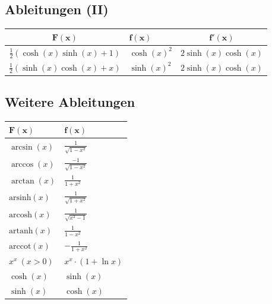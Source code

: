 \documentclass[a4paper,10pt]{article}
\begin{document}
\subsection{Ableitungen (II)}
\begin{center}
  \begin{tabularx}{\linewidth}{c>{\centering\arraybackslash}Xc}
  \toprule
  $\mathbf{F(x)}$ & $\mathbf{f(x)}$ & $\mathbf{f'(x)}$ \\
  \midrule
  $\frac{1}{2}(\cosh(x)\sinh(x)+1)$ & $\cosh(x)^2$ & $2\sinh(x)\cosh(x)$\\
  $\frac{1}{2}(\sinh(x)\cosh(x) + x)$ & $\sinh(x)^2$ & $2\sinh(x)\cosh(x)$\\
  \bottomrule
  \end{tabularx}
\end{center}

\subsection{Weitere Ableitungen}
\begin{center}
  \begin{tabularx}{\linewidth}{>{\centering\arraybackslash}X>{\centering\arraybackslash}X}
  \toprule
  $\mathbf{F(x)}$ & $\mathbf{f(x)}$ \\
  \midrule
  $\arcsin(x)$ & $\frac{1}{\sqrt{1 - x^2}}$ \\
  $\arccos(x)$ & $\frac{-1}{\sqrt{1 - x^2}}$ \\
  $\arctan(x)$ & $\frac{1}{1 + x^2}$ \\ 
  $\text{arsinh}(x)$ & $\frac{1}{\sqrt{1 + x^2}}$ \\
  $\text{arcosh}(x)$ & $\frac{1}{\sqrt{x^2 - 1}}$ \\
  $\text{artanh}(x)$ & $\frac{1}{1 - x^2}$ \\
  $\text{arccot}(x)$ & $-\frac{1}{1 + x^2}$ \\
  $x^x \ (x > 0)$ & $x^x \cdot (1 + \ln x)$ \\
  $\cosh(x)$ & $\sinh(x)$ \\
  $\sinh(x)$ & $\cosh(x)$ \\
  \bottomrule
  \end{tabularx}
\end{center}
\end{document}

